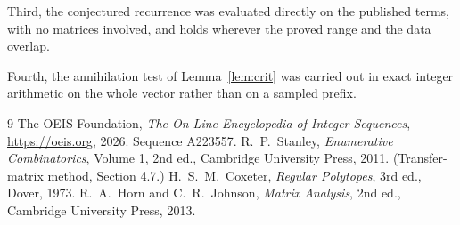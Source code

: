 \documentclass[11pt,a4paper]{article}
\theoremstyle{plain}
\theoremstyle{definition}
\begin{document}
Third, the conjectured recurrence was evaluated directly on the published terms, with no
matrices involved, and holds wherever the proved range and the data overlap.

Fourth, the annihilation test of Lemma~\ref{lem:crit} was carried out in exact integer
arithmetic on the whole vector rather than on a sampled prefix.

\begin{thebibliography}{9}
 The OEIS Foundation, \emph{The On-Line Encyclopedia of Integer
Sequences}, \url{https://oeis.org}, 2026. Sequence A223557.
 R.~P.~Stanley, \emph{Enumerative Combinatorics}, Volume 1, 2nd ed.,
Cambridge University Press, 2011. (Transfer-matrix method, Section 4.7.)
 H.~S.~M.~Coxeter, \emph{Regular Polytopes}, 3rd ed., Dover, 1973.
 R.~A.~Horn and C.~R.~Johnson, \emph{Matrix Analysis}, 2nd ed., Cambridge
University Press, 2013.
\end{thebibliography}
\end{document}
